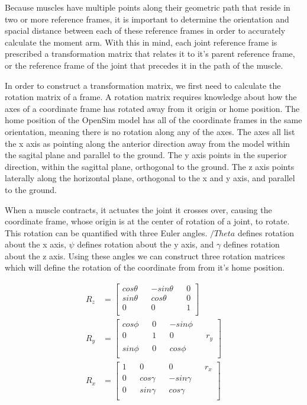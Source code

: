 \documentclass[runningheads]{llncs}
\begin{document}
Because muscles have multiple points along their geometric path that reside in two or more reference frames, it is important to determine the orientation and spacial distance between each of these reference frames in order to accurately calculate the moment arm. With this in mind, each joint reference frame is prescribed a transformation matrix that relates it to it's parent reference frame, or the reference frame of the joint that precedes it in the path of the muscle.

In order to construct a transformation matrix, we first need to calculate the rotation matrix of a frame. A rotation matrix requires knowledge about how the axes of a coordinate frame has rotated away from it origin or home position. The home position of the OpenSim model has all of the coordinate frames in the same orientation, meaning there is no rotation along any of the axes. The axes all list the x axis as pointing along the anterior direction away from the model within the sagital plane and parallel to the ground. The y axis points in the superior direction, within the sagittal plane, orthogonal to the ground. The z axis points laterally along the horizontal plane, orthogonal to the x and y axis, and parallel to the ground.


When a muscle contracts, it actuates the joint it crosses over, causing the coordinate frame, whose origin is at the center of rotation of a joint, to rotate. This rotation can be quantified with three Euler angles. $/Theta$ defines rotation about the x axis, $\psi$ defines rotation about the y axis, and $\gamma$ defines rotation about the z axis. Using these angles we can construct three rotation matrices which will define the rotation of the coordinate from from it's home position.

\begin{align}
    R_z &= \begin{bmatrix}
                cos\theta && -sin\theta && 0\\
                sin\theta && cos\theta && 0\\
                0 && 0 && 1\\
            \end{bmatrix}\\
    R_y &= \begin{bmatrix}
                cos\phi && 0 && -sin\phi\\
                0 && 1 && 0 && r_y\\
                sin\phi && 0 && cos\phi\\
            \end{bmatrix}\\
    R_x &= \begin{bmatrix}
                1 && 0 && 0 && r_x\\
                0 && cos\gamma && -sin\gamma\\
                0 && sin\gamma && cos\gamma\\
            \end{bmatrix}
\end{align}
\end{document}
